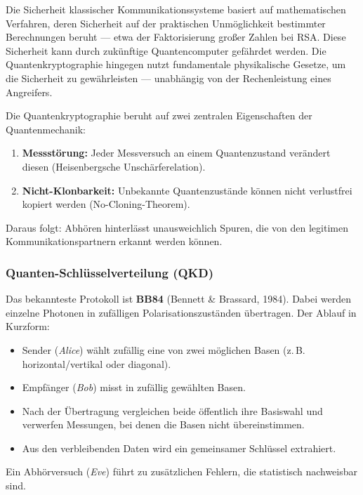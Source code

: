 Die Sicherheit klassischer Kommunikationssysteme basiert auf mathematischen Verfahren, deren Sicherheit auf der praktischen Unmöglichkeit bestimmter Berechnungen beruht — etwa der Faktorisierung großer Zahlen bei RSA. Diese Sicherheit kann durch zukünftige Quantencomputer gefährdet werden.  
Die Quantenkryptographie hingegen nutzt fundamentale physikalische Gesetze, um die Sicherheit zu gewährleisten — unabhängig von der Rechenleistung eines Angreifers.
\medskip
\begin{tcolorbox}[physikbox, title=Kernprinzip der Quantenkryptographie \label{box:qcrypto_prinzip}]
	\small
	Die Quantenkryptographie beruht auf zwei zentralen Eigenschaften der Quantenmechanik:
	\begin{enumerate}
		\item \textbf{Messstörung:} Jeder Messversuch an einem Quantenzustand verändert diesen (Heisenbergsche Unschärferelation).
		\item \textbf{Nicht-Klonbarkeit:} Unbekannte Quantenzustände können nicht verlustfrei kopiert werden (No-Cloning-Theorem).
	\end{enumerate}
	Daraus folgt: Abhören hinterlässt unausweichlich Spuren, die von den legitimen Kommunikationspartnern erkannt werden können.
\end{tcolorbox}

\subsubsection{Quanten-Schlüsselverteilung (QKD)}

Das bekannteste Protokoll ist \textbf{BB84} (Bennett \& Brassard, 1984). Dabei werden einzelne Photonen in zufälligen Polarisationszuständen übertragen.  
Der Ablauf in Kurzform:
\begin{itemize}
	\item Sender (\emph{Alice}) wählt zufällig eine von zwei möglichen Basen (z.\,B. horizontal/vertikal oder diagonal).
	\item Empfänger (\emph{Bob}) misst in zufällig gewählten Basen.
	\item Nach der Übertragung vergleichen beide öffentlich ihre Basiswahl und verwerfen Messungen, bei denen die Basen nicht übereinstimmen.
	\item Aus den verbleibenden Daten wird ein gemeinsamer Schlüssel extrahiert.
\end{itemize}
Ein Abhörversuch (\emph{Eve}) führt zu zusätzlichen Fehlern, die statistisch nachweisbar sind.


